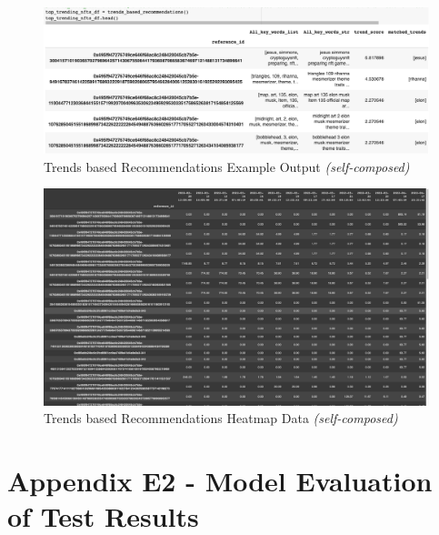 \begin{figure}[h!]
\centering
\includegraphics[width=\textwidth]{images/Testing/trends/top-trends-output-df.png}
\caption{Trends based Recommendations Example Output \textit{(self-composed)}}
\label{fig:trends-recsys-output-example}
\end{figure}

\begin{figure}[h!]
\centering
\includegraphics[width=\textwidth]{images/Testing/trends/heatmap-data.png}
\caption{Trends based Recommendations Heatmap Data \textit{(self-composed)}}
\label{fig:trends-recsys-heatmap-data-matrix}
\end{figure}


\clearpage
\section*{Appendix E2 - Model Evaluation of Test Results}

